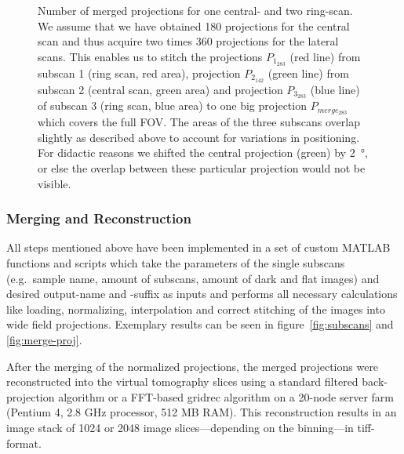 \begin{figure*}
	\centering
	\caption[Number of merged projections for one central- and two ring-scan.]{Number of merged projections for one central- and two ring-scan. We assume that we have obtained 180 projections for the central scan and thus acquire two times 360 projections for the lateral scans. This enables us to stitch the projections $P_{1_{283}}$ %
    (red line) from subscan 1 (ring scan, red area), projection $P_{2_{142}}$ %
    (green line) from subscan 2 (central scan, green area) and projection $P_{3_{283}}$ %
    (blue line) of subscan 3 (ring scan, blue area) to one big projection $P_{merge_{283}}$ %
    which covers the full FOV. The areas of the three subscans overlap slightly as described above to account for variations in positioning. For didactic reasons we shifted the central projection (green) by \SI{2}{\degree}, or else the overlap between these particular projection would not be visible.}%
	\label{fig:amount of projections}%
\end{figure*}


\subsubsection{Merging and Reconstruction}
All steps mentioned above have been implemented in a set of custom MATLAB functions and scripts which take the parameters of the single subscans (e.g.\ sample name, amount of subscans, amount of dark and flat images) and desired output-name and -suffix as inputs and performs all necessary calculations like loading, normalizing, interpolation and correct stitching of the images into wide field projections. Exemplary results can be seen in figure~\ref{fig:subscans} and \ref{fig:merge-proj}.

After the merging of the normalized projections, the merged projections were reconstructed into the virtual tomography slices using a standard filtered back-projection algorithm or a FFT-based gridrec algorithm on a 20-node server farm (Pentium 4, 2.8 GHz processor, 512 MB RAM). This reconstruction results in an image stack of 1024 or 2048 image slices---depending on the binning---in tiff-format.

